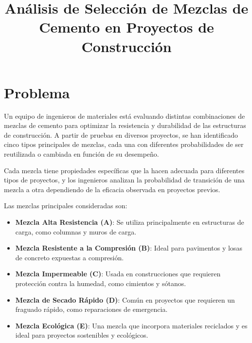 \documentclass{article}
\begin{document}
\title{Análisis de Selección de Mezclas de Cemento en Proyectos de Construcción}
\author{}
\date{}
\maketitle

\section*{Problema}

Un equipo de ingenieros de materiales está evaluando distintas combinaciones de mezclas de cemento para optimizar la resistencia y durabilidad de las estructuras de construcción. A partir de pruebas en diversos proyectos, se han identificado cinco tipos principales de mezclas, cada una con diferentes probabilidades de ser reutilizada o cambiada en función de su desempeño.

Cada mezcla tiene propiedades específicas que la hacen adecuada para diferentes tipos de proyectos, y los ingenieros analizan la probabilidad de transición de una mezcla a otra dependiendo de la eficacia observada en proyectos previos.

Las mezclas principales consideradas son:
\begin{itemize}
    \item \textbf{Mezcla Alta Resistencia (A)}: Se utiliza principalmente en estructuras de carga, como columnas y muros de carga.
    \item \textbf{Mezcla Resistente a la Compresión (B)}: Ideal para pavimentos y losas de concreto expuestas a compresión.
    \item \textbf{Mezcla Impermeable (C)}: Usada en construcciones que requieren protección contra la humedad, como cimientos y sótanos.
    \item \textbf{Mezcla de Secado Rápido (D)}: Común en proyectos que requieren un fraguado rápido, como reparaciones de emergencia.
    \item \textbf{Mezcla Ecológica (E)}: Una mezcla que incorpora materiales reciclados y es ideal para proyectos sostenibles y ecológicos.
\end{itemize}
\end{document}
